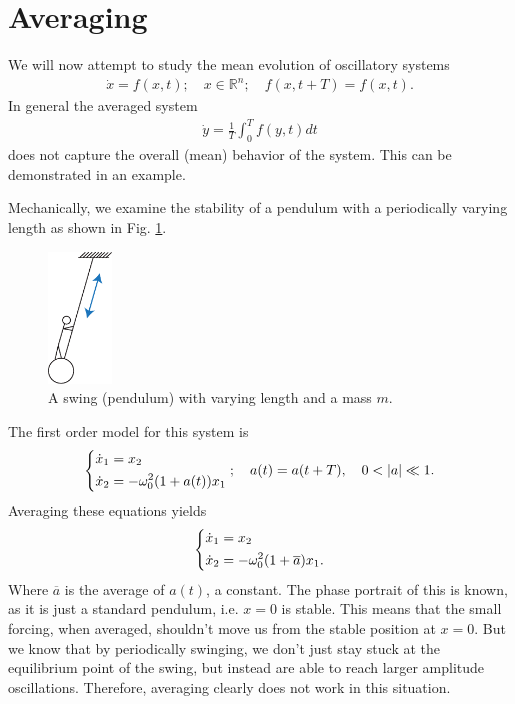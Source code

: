 \section{Averaging}
We will now attempt to study the mean evolution of oscillatory systems
\begin{align}
	\dot{x} = f(x,t);\quad x \in \mathbb{R}^{n};\quad f(x,t+T) = f(x,t).
\end{align}
In general the averaged system
\begin{align}
	\dot{y} = \frac{1}{T} \int_{0}^{T} f(y,t)dt	
\end{align}
does not capture the overall (mean) behavior of the system. This can be demonstrated in an example.
\begin{ex}
	Mechanically, we examine the stability of a pendulum with a periodically varying length as shown in Fig. \ref{fig:swing_drawing}.
	\begin{figure}[h!]
		\centering
		\includegraphics[width=0.15\textwidth]{figures/ch5/2swing_drawing.pdf}
		\caption{A swing (pendulum) with varying length and a mass $m$.}
		\label{fig:swing_drawing}
	\end{figure}
	The first order model for this system is
	\begin{align}
		\begin{dcases}
			\dot{x}_1 = x_2\\
			\dot{x}_2 = -\omega_0^2 (1+a(t))x_1
		\end{dcases}
		;\quad a(t) = a(t+T),\quad 0<|a|\ll 1.	
	\end{align}
Averaging these equations yields
\begin{align}
	\begin{dcases}
		\dot{x}_1 = x_2 \\
		\dot{x}_2 = -\omega_0^2(1+ \overline{a})x_1.
	\end{dcases}
\end{align}
Where $\overline{a}$ is the average of $a(t)$, a constant. The phase portrait of this is known, as it is just a standard pendulum, i.e. $x=0$ is stable. This means that the small forcing, when averaged, shouldn't move us from the stable position at $x=0$. But we know that by periodically swinging, we don't just stay stuck at the equilibrium point of the swing, but instead are able to reach larger amplitude oscillations. Therefore, averaging clearly does not work in this situation. 
\end{ex}

